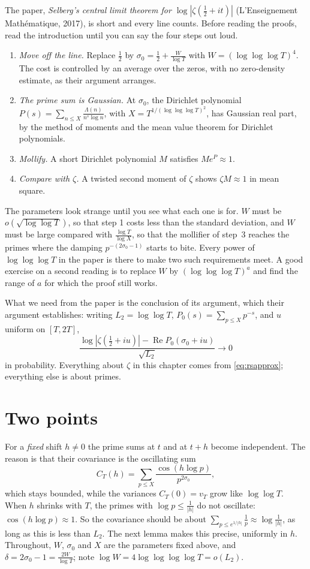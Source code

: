 The paper, \emph{Selberg's central limit theorem for $\log|\zeta(\frac12+it)|$} (L'Enseignement Math\'ematique, 2017), is short and every line counts. Before reading the proofs, read the introduction until you can say the four steps out loud.
\begin{enumerate}
\item \emph{Move off the line.} Replace $\frac12$ by $\sigma_0=\frac12+\frac W{\log T}$ with $W=(\log\log\log T)^4$. The cost is controlled by an average over the zeros, with no zero-density estimate, as their argument arranges.
\item \emph{The prime sum is Gaussian.} At $\sigma_0$, the Dirichlet polynomial $P(s)=\sum_{n\le X}\frac{\Lambda(n)}{n^s\log n}$, with $X=T^{1/(\log\log\log T)^2}$, has Gaussian real part, by the method of moments and the mean value theorem for Dirichlet polynomials.
\item \emph{Mollify.} A short Dirichlet polynomial $M$ satisfies $Me^P\approx1$.
\item \emph{Compare with $\zeta$.} A twisted second moment of $\zeta$ shows $\zeta M\approx1$ in mean square.
\end{enumerate}
The parameters look strange until you see what each one is for. $W$ must be $o(\sqrt{\log\log T})$, so that step 1 costs less than the standard deviation, and $W$ must be large compared with $\frac{\log T}{\log X}$, so that the mollifier of step~3 reaches the primes where the damping $p^{-(2\sigma_0-1)}$ starts to bite. Every power of $\log\log\log T$ in the paper is there to make two such requirements meet. A good exercise on a second reading is to replace $W$ by $(\log\log\log T)^a$ and find the range of $a$ for which the proof still works.

What we need from the paper is the conclusion of its argument, which their argument establishes: writing $L_2=\log\log T$, $P_0(s)=\sum_{p\le X}p^{-s}$, and $u$ uniform on $[T,2T]$,
\begin{equation}\label{eq:rsapprox}
\frac{\log|\zeta(\frac12+iu)|-\operatorname{Re}P_0(\sigma_0+iu)}{\sqrt{L_2}}\longrightarrow0
\end{equation}
in probability. 
Everything about $\zeta$ in this chapter comes from \eqref{eq:rsapprox}; everything else is about primes.

\section{Two points}

For a \emph{fixed} shift $h\ne0$ the prime sums at $t$ and at $t+h$ become independent. The reason is that their covariance is the oscillating sum
\[
C_T(h)=\sum_{p\le X}\frac{\cos(h\log p)}{p^{2\sigma_0}},
\]
which stays bounded, while the variances $C_T(0)=v_T$ grow like $\log\log T$. When $h$ shrinks with $T$, the primes with $\log p\le\frac1{|h|}$ do not oscillate: $\cos(h\log p)\approx1$. So the covariance should be about $\sum_{p\le e^{1/|h|}}\frac1p\approx\log\frac1{|h|}$, as long as this is less than $L_2$. The next lemma makes this precise, uniformly in $h$. Throughout, $W$, $\sigma_0$ and $X$ are the parameters fixed above, and $\delta=2\sigma_0-1=\frac{2W}{\log T}$; note $\log W=4\log\log\log\log T=o(L_2)$.

